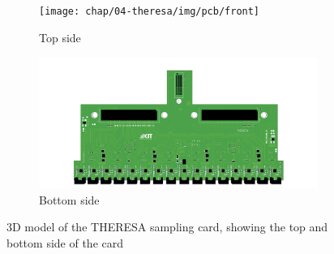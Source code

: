 \begin{figure}[tb]
	\centering
	\begin{subfigure}{\textwidth}
		\centering
		\texttt{[image: chap/04-theresa/img/pcb/front]}  
		\caption{Top side}
		\label{fig:pcb_front}
	\end{subfigure}
	\begin{subfigure}{\textwidth}
		\centering
		\includegraphics[width=\textwidth]{chap/04-theresa/img/pcb/back}  
		\caption{Bottom side}
		\label{fig:pcb_back}
	\end{subfigure}
	\caption[THERESA sampling card]{3D model of the THERESA sampling card, showing the top and bottom side of the card}
	\label{fig:sampling_card}
\end{figure}